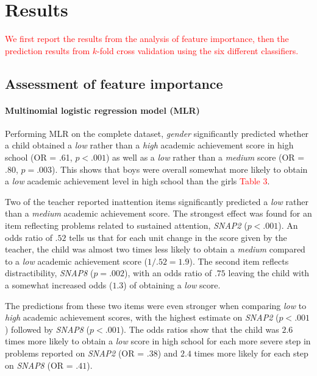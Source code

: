 \documentclass[10pt,letterpaper]{article}
\begin{document}
{{\section*{Results}

\textcolor{red}{We first report the results from the analysis of feature importance, then the prediction results from $k$-fold cross validation using the six different classifiers.}

\subsection*{Assessment of feature importance} 


\paragraph{Multinomial logistic regression model (MLR)}


Performing MLR on the complete dataset, {\it gender} significantly predicted whether a child obtained a {\it low} rather than a {\it high} academic achievement score in high school (OR = .61, $p < .001$) as well as a {\it low} rather than a {\it medium} score (OR = $.80$, $p = .003$). This shows that boys were overall somewhat more likely to obtain a {\it low} academic achievement level in high school than the girls \textcolor{red}{Table 3}. 

Two of the teacher reported inattention items significantly predicted a {\it low} rather than a {\it medium} academic achievement score. The strongest effect was found for an item reflecting problems related to sustained attention, {\it SNAP2} ($p < .001$). An odds ratio of $.52$ tells us that for each unit change in the score given by the teacher, the child was almost two times less likely to obtain a {\it medium} compared to a {\it low} academic achievement score ($1/.52 = 1.9$). The second item reflects distractibility, {\it SNAP8} ($p = .002$), with an odds ratio of $.75$ leaving the child with a somewhat increased odds ($1.3$) of obtaining a {\it low} score.  


The predictions from these two items were even stronger when comparing {\it low} to {\it high} academic achievement scores, with the highest estimate on {\it SNAP2} ($p < .001$) 
followed by {\it SNAP8} ($p < .001$).  The odds ratios show that the child was $2.6$ times more likely to obtain a {\it low} score in high school for each more severe step in problems reported on {\it SNAP2} (OR = $.38$) and  $2.4$ times more likely for each step on {\it SNAP8} (OR = $.41$).  

}}
\end{document}
